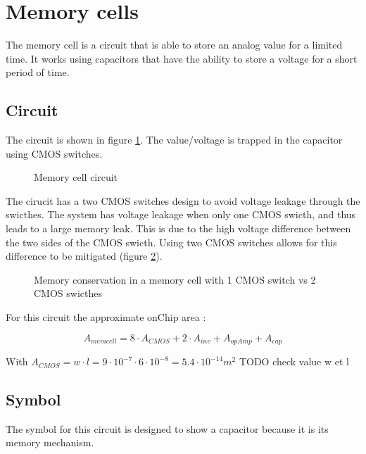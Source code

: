 \section{Memory cells}
\label{sec:memcell}

The memory cell is a circuit that is able to store an analog value for a limited time. It works using capacitors that have the ability to store a voltage for a short period of time.

\subsection{Circuit}

The circuit is shown in figure \ref{fig:memcellCircuit}. The value/voltage is trapped in the capacitor using CMOS switches.

\begin{figure}[H]
  \centering
  
  \caption{Memory cell circuit}
  \label{fig:memcellCircuit}
\end{figure}

The cirucit has a two CMOS switches design to avoid voltage leakage through the swicthes. The system has voltage leakage when only one CMOS swicth, and thus leads to a large memory leak. This is due to the high voltage difference between the two sides of the CMOS swicth. Using two CMOS switches allows for this difference to be mitigated (figure \ref{fig:memcellLoss}).

\begin{figure}[H]
  \centering
  
  \caption{Memory conservation in a memory cell with 1 CMOS switch vs 2 CMOS swicthes}
  \label{fig:memcellLoss}
\end{figure}

For this circuit the approximate onChip area :

\begin{equation}
  A_{memcell}=8\cdot A_{CMOS}+2\cdot A_{inv}+A_{opAmp}+A_{cap}
\end{equation}

With $A_{CMOS} = w\cdot l = 9\cdot 10^{-7} \cdot 6 \cdot 10^{-8} = 5.4 \cdot 10^{-14} m^2$ TODO check value w et l

\subsection{Symbol}

The symbol for this circuit is designed to show a capacitor because it is its memory mechanism.

